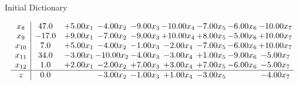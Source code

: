 \documentclass[8pt]{article}
\begin{document}
Initial Dictionary 

\[\begin{array}{c| c c@{\hskip 2pt} c@{\hskip 2pt} c@{\hskip 2pt} c@{\hskip 2pt} c@{\hskip 2pt} c@{\hskip 2pt} c@{\hskip 2pt} }
 x_{8}   &  47.0 & +  5.00 x_{1} & -4.00 x_{2} & -9.00 x_{3} & -10.00 x_{4} & -7.00 x_{5} & -6.00 x_{6} & -10.00 x_{7}\\
 x_{9}   &  -17.0 & +  9.00 x_{1} & -7.00 x_{2} & -9.00 x_{3} & + 10.00 x_{4} & +  8.00 x_{5} & -5.00 x_{6} & + 10.00 x_{7}\\
 x_{10}   &  7.0 & +  5.00 x_{1} & -4.00 x_{2} & -1.00 x_{3} & -2.00 x_{4} & -7.00 x_{5} & -6.00 x_{6} & + 10.00 x_{7}\\
 x_{11}   &  34.0 & -3.00 x_{1} & -10.00 x_{2} & -4.00 x_{3} & -3.00 x_{4} & +  1.00 x_{5} & -9.00 x_{6} & -5.00 x_{7}\\
 x_{12}   &  1.0 & +  2.00 x_{1} & -2.00 x_{2} & +  7.00 x_{3} & +  3.00 x_{4} & +  7.00 x_{5} & -6.00 x_{6} & -5.00 x_{7}\\
\hline
z    &  0.0  &   & -3.00 x_{2} & -1.00 x_{3} & +  1.00 x_{4} & -3.00 x_{5} &   & -4.00 x_{7}\\
\end{array}\]
\end{document}
